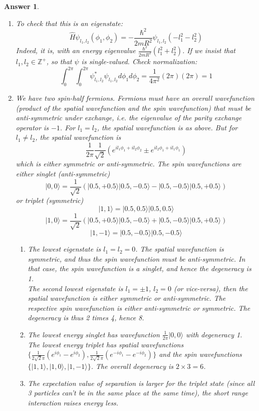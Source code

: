 \documentclass[a4paper]{article}
\newtheorem{ans}{Answer}[subsection]
\theoremstyle{new}
\begin{document}
\begin{ans}\leavevmode
\begin{enumerate}[label=(\roman*)]
\item To check that this is an eigenstate:
$$\hat{H}\psi_{l_1,l_2}(\phi_1,\phi_2)=-\frac{\hbar^2}{2mR^2}\psi_{l_1,l_2}(-l_1^2-l_2^2)$$
Indeed, it is, with an energy eigenvalue $\frac{\hbar^2}{2mR^2}(l_1^2+l_2^2)$. If we insist that $l_1,l_2\in\mathbb{Z}^+$, so that $\psi$ is single-valued. Check normalization:
$$\int_0^{2\pi}\int_0^{2\pi}\psi_{l_1,l_2}^*\psi_{l_1,l_2}d\phi_1d\phi_2=\frac{1}{4\pi^2}(2\pi)(2\pi)=1$$
\item We have two spin-half fermions. Fermions must have an overall wavefunction (product of the spatial wavefunction and the spin wavefunction) that must be anti-symmetric under exchange, i.e. the eigenvalue of the parity exchange operator is $-1$. For $l_1=l_2$, the spatial wavefunction is as above. But for $l_1\neq l_2$, the spatial wavefunction is
$$\frac{1}{2\pi}\frac{1}{\sqrt{2}}(e^{il_1\phi_1+il_2\phi_2}\pm e^{il_2\phi_1+il_1\phi_1})$$
which is either symmetric or anti-symmetric. The spin wavefunctions are either singlet (anti-symmetric)
$$|0,0\rangle=\frac{1}{\sqrt{2}}(|0.5,+0.5\rangle|0.5,-0.5\rangle-|0.5,-0.5\rangle|0.5,+0.5\rangle)$$
or triplet (symmetric)
$$|1,1\rangle=|0.5,0.5\rangle|0.5,0.5\rangle$$
$$|1,0\rangle=\frac{1}{\sqrt{2}}(|0.5,+0.5\rangle|0.5,-0.5\rangle+|0.5,-0.5\rangle|0.5,+0.5\rangle)$$
$$|1,-1\rangle=|0.5,-0.5\rangle|0.5,-0.5\rangle$$
\begin{enumerate}[label=(\alph*)]
\item The lowest eigenstate is $l_1=l_2=0$. The spatial wavefunction is symmetric, and thus the spin wavefunction must be anti-symmetric. In that case, the spin wavefunction is a singlet, and hence the degeneracy is 1.\\[5pt]
The second lowest eigenstate is $l_1=\pm1$, $l_2=0$ (or vice-versa), then the spatial wavefunction is either symmetric or anti-symmetric. The respective spin wavefunction is either anti-symmetric or symmetric. The degeneracy is thus 2 times 4, hence 8.
\item The lowest energy singlet has wavefunction $\frac{1}{2\pi}|0,0\rangle$ with degeneracy 1. The lowest energy triplet has spatial wavefunctions $\{\frac{1}{2\sqrt{2}\pi}(e^{i\phi_1}-e^{i\phi_2}),\frac{1}{2\sqrt{2}\pi}(e^{-i\phi_1}-e^{-i\phi_2})\}$ and the spin wavefunctions $\{|1,1\rangle,|1,0\rangle,|1,-1\rangle\}$. The overall degeneracy is $2\times 3=6$.
\item The expectation value of separation is larger for the triplet state (since all 3 particles can't be in the same place at the same time), the short range interaction raises energy less.
\end{enumerate}
\end{enumerate}
\end{ans}
\newpage
\end{document}

